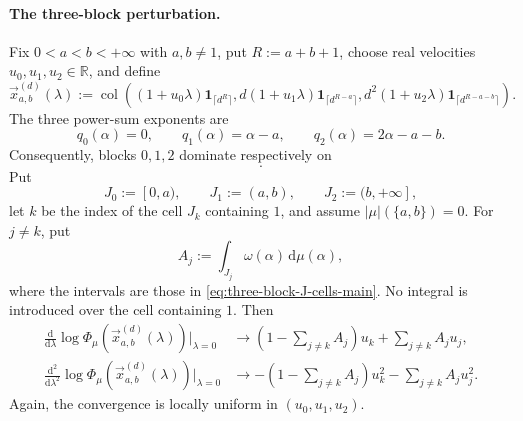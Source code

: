\documentclass[aps,pra,11pt,onecolumn,nofootinbib,tightenlines]{revtex4-2}
\theoremstyle{definition}
\begin{document}
\paragraph{The three-block perturbation.}
Fix $0<a<b<+\infty$ with $a,b\neq1$, put $R:=a+b+1$, choose real
velocities $u_0,u_1,u_2\in\mathbb R$, and define
\begin{equation}
 \vec x_{a,b}^{(d)}(\lambda)
 :=\operatorname{col}\!\left(
 (1+u_0\lambda)\mathbf1_{\lceil d^R\rceil},
 d(1+u_1\lambda)\mathbf1_{\lceil d^{R-a}\rceil},
 d^2(1+u_2\lambda)\mathbf1_{\lceil d^{R-a-b}\rceil}
 \right).
 \label{eq:three-block-path-main}
\end{equation}
The three power-sum exponents are
\begin{equation}
 q_0(\alpha)=0,
 \qquad
 q_1(\alpha)=\alpha-a,
 \qquad
 q_2(\alpha)=2\alpha-a-b.
 \label{eq:three-block-exponents-main}
\end{equation}
Consequently, blocks $0,1,2$ dominate respectively on
\begin{equation}
 [0,a),
 \qquad
 (a,b),
 \qquad
 (b,+\infty].
 \label{eq:three-block-cells-main}
\end{equation}
Put
\begin{equation}
 J_0:=[0,a),
 \qquad J_1:=(a,b),
 \qquad J_2:=(b,+\infty],
 \label{eq:three-block-J-cells-main}
\end{equation}
let $k$ be the index of the cell $J_k$ containing $1$, and assume
$|\mu|(\{a,b\})=0$. For $j\neq k$, put
\begin{equation}
 A_j:=\int_{J_j}\omega(\alpha)\,\mathrm d\mu(\alpha),
 \label{eq:three-block-A-j}
\end{equation}
where the intervals are those in \eqref{eq:three-block-J-cells-main}. No integral is introduced over the cell containing $1$. Then
\begin{align}
 \frac{\mathrm d}{\mathrm d\lambda}
 \log\Phi_\mu(\vec x_{a,b}^{(d)}(\lambda))\bigg|_{\lambda=0}
 &\longrightarrow
 \left(1-\sum_{j\neq k}A_j\right)u_k
 +\sum_{j\neq k}A_ju_j,
 \label{eq:three-block-log-first-main}\\
 \frac{\mathrm d^2}{\mathrm d\lambda^2}
 \log\Phi_\mu(\vec x_{a,b}^{(d)}(\lambda))\bigg|_{\lambda=0}
 &\longrightarrow
 -\left(1-\sum_{j\neq k}A_j\right)u_k^2
 -\sum_{j\neq k}A_ju_j^2.
 \label{eq:three-block-log-second-main}
\end{align}
Again, the convergence is locally uniform in $(u_0,u_1,u_2)$.
\end{document}
